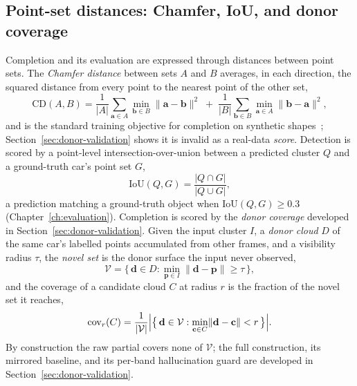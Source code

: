 \subsection{Point-set distances: Chamfer, IoU, and donor coverage}
\label{sec:th-distances}
Completion and its evaluation are expressed through distances between point sets. The
\emph{Chamfer distance} between sets $A$ and $B$ averages, in each direction, the squared
distance from every point to the nearest point of the other set,
\begin{equation}
  \mathrm{CD}(A,B) = \frac{1}{\lvert A\rvert}\sum_{\mathbf{a}\in A} \min_{\mathbf{b}\in B} \lVert\mathbf{a}-\mathbf{b}\rVert^2 \;+\; \frac{1}{\lvert B\rvert}\sum_{\mathbf{b}\in B} \min_{\mathbf{a}\in A} \lVert\mathbf{b}-\mathbf{a}\rVert^2 ,
\end{equation}
and is the standard training objective for completion on synthetic
shapes~\cite{fan2017point,yuan2019pcnpointcompletionnetwork};
Section~\ref{sec:donor-validation} shows it is invalid as a real-data \emph{score}. Detection is
scored by a point-level intersection-over-union between a predicted cluster $Q$ and a
ground-truth car's point set $G$,
\begin{equation}
  \mathrm{IoU}(Q,G) = \frac{\lvert Q \cap G\rvert}{\lvert Q \cup G\rvert},
\end{equation}
a prediction matching a ground-truth object when $\mathrm{IoU}(Q,G)\ge 0.3$
(Chapter~\ref{ch:evaluation}). Completion is scored by the \emph{donor coverage} developed
in Section~\ref{sec:donor-validation}. Given the input cluster $I$, a \emph{donor cloud} $D$ of
the same car's labelled points accumulated from other frames, and a visibility radius
$\tau$, the \emph{novel set} is the donor surface the input never observed,
\begin{equation}
  \mathcal{V} = \bigl\{\, \mathbf{d}\in D : \min_{\mathbf{p}\in I} \lVert\mathbf{d}-\mathbf{p}\rVert \ge \tau \,\bigr\},
\end{equation}
and the coverage of a candidate cloud $C$ at radius $r$ is the fraction of the novel set it
reaches,
\begin{equation}
  \mathrm{cov}_r(C) = \frac{1}{\lvert\mathcal{V}\rvert} \Bigl\lvert \bigl\{\, \mathbf{d}\in\mathcal{V} : \min_{\mathbf{c}\in C} \lVert\mathbf{d}-\mathbf{c}\rVert < r \,\bigr\} \Bigr\rvert .
\end{equation}
By construction the raw partial covers none of $\mathcal{V}$; the full construction, its
mirrored baseline, and its per-band hallucination guard are developed in
Section~\ref{sec:donor-validation}.
